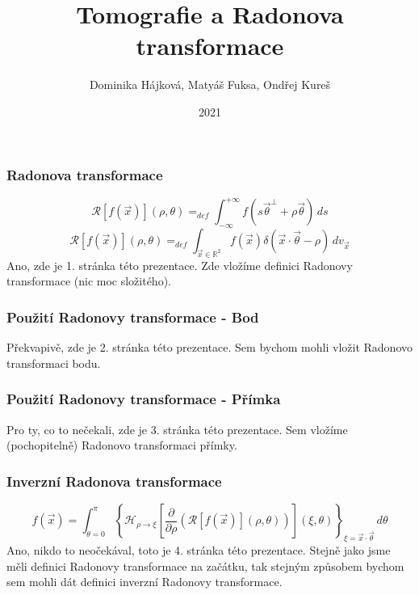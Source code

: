 \documentclass{beamer}
\title{Tomografie a Radonova transformace}
\author{Dominika Hájková, Matyáš Fuksa, Ondřej Kureš}
\institute{Skupina W}
\date{2021}
\begin{document}
\frame{\titlepage}

\begin{frame}
\frametitle{Radonova transformace}
\begin{equation}
\mathcal{R}[f(\vec{x})](\rho, \theta)=_{def} \int_{-\infty}^{+\infty}f(s \vec{\theta}^\perp + \rho \vec{\theta}) \,ds
\end{equation}
\begin{equation}
\mathcal{R}[f(\vec{x})](\rho, \theta)=_{def} \int_{\vec{x}\in \mathbb{R}^2}f(\vec{x})\delta \left(\vec{x}\cdot\vec{\theta} - \rho\right) \,dv_{\vec{x}} 
\end{equation}
Ano, zde je 1. stránka této prezentace. Zde vložíme definici Radonovy transformace (nic moc složitého).
\end{frame}
\begin{frame}
\frametitle{Použití Radonovy transformace - Bod}
Překvapivě, zde je 2. stránka této prezentace. Sem bychom mohli vložit Radonovo transformaci bodu.
\end{frame}
\begin{frame}
\frametitle{Použití Radonovy transformace - Přímka}
Pro ty, co to nečekali, zde je 3. stránka této prezentace. Sem vložíme (pochopitelně) Radonovo transformaci přímky.
\end{frame}
\begin{frame}
\frametitle{Inverzní Radonova transformace}
\begin{equation}
f(\vec{x})=  \int_{\theta=0}^{\pi}
	\left\lbrace
		\mathcal{H}_{\rho \to \xi}
			\left[\frac{\partial}{\partial\rho}
				\left(\mathcal{R}[f(\vec{x})](\rho,\theta)
				\right)
			\right]
		(\xi,\theta)
	\right\rbrace
	_{\xi = \vec{x}\cdot\vec{\theta}}
	\,d\theta
\end{equation}
Ano, nikdo to neočekával, toto je 4. stránka této prezentace. Stejně jako jsme měli definici Radonovy transformace na začátku, tak stejným způsobem bychom sem mohli dát definici inverzní Radonovy transformace.
\end{frame}
\end{document}

